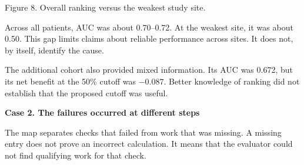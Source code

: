 \documentclass[10pt,a4paper]{article}
\newcommand{\reportcase}[2]{{\Large\bfseries Case #1. #2\par}\vspace{2mm}}
\newcommand{\reportcaption}[1]{\par{\small\color{Muted}#1\par}\vspace{1mm}}
\begin{document}
\begin{center}
\end{center}
\reportcaption{Figure 8. Overall ranking versus the weakest study site.}

Across all patients, AUC was about 0.70--0.72. At the weakest site, it was about 0.50. This gap limits claims about reliable performance across sites. It does not, by itself, identify the cause.

The additional cohort also provided mixed information. Its AUC was 0.672, but its net benefit at the 50\% cutoff was $-0.087$. Better knowledge of ranking did not establish that the proposed cutoff was useful.

\newpage
\reportcase{2}{The failures occurred at different steps}
The map separates checks that failed from work that was missing. A missing entry does not prove an incorrect calculation. It means that the evaluator could not find qualifying work for that check.
\end{document}
